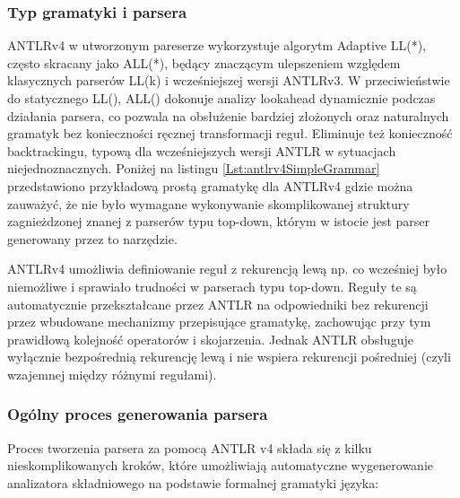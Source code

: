 \documentclass[12pt,twoside]{article}
\begin{document}
\subsubsection{Typ gramatyki i parsera}
ANTLRv4 w utworzonym pareserze wykorzystuje algorytm Adaptive LL(*), często skracany jako ALL(*), będący znaczącym ulepszeniem względem klasycznych parserów LL(k) i wcześniejszej wersji ANTLRv3. W przeciwieństwie do statycznego LL(), ALL() dokonuje analizy lookahead dynamicznie podczas działania parsera, co pozwala na obsłużenie bardziej złożonych oraz naturalnych gramatyk bez konieczności ręcznej transformacji reguł.\cite{antlr4GitHub} Eliminuje też konieczność backtrackingu, typową dla wcześniejszych wersji ANTLR w sytuacjach niejednoznacznych\cite{Antlr4Optimisation}. Poniżej na listingu \ref{Lst:antlrv4SimpleGrammar} przedstawiono przykładową prostą gramatykę dla ANTLRv4 gdzie można zauważyć, że nie było wymagane wykonywanie skomplikowanej struktury zagnieżdzonej znanej z parserów typu top-down\cite{antlr4Book}, którym w istocie jest parser generowany przez to narzędzie.



ANTLRv4 umożliwia definiowanie reguł z rekurencją lewą np.  co wcześniej było niemożliwe i sprawiało trudności w parserach typu top-down. Reguły te są automatycznie przekształcane przez ANTLR na odpowiedniki bez rekurencji przez wbudowane mechanizmy przepisujące gramatykę, zachowując przy tym prawidłową kolejność operatorów i skojarzenia. Jednak ANTLR obsługuje wyłącznie bezpośrednią rekurencję lewą i nie wspiera rekurencji pośredniej (czyli wzajemnej między różnymi regułami).

\subsubsection{Ogólny proces generowania parsera}
Proces tworzenia parsera za pomocą ANTLR v4 składa się z kilku nieskomplikowanych kroków, które umożliwiają automatyczne wygenerowanie analizatora składniowego na podstawie formalnej gramatyki języka:
\end{document}
